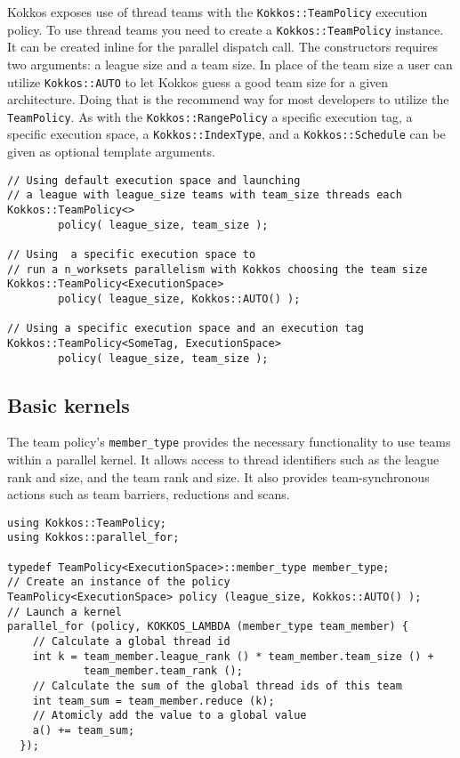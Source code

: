 Kokkos exposes use of thread teams with the \lstinline!Kokkos::TeamPolicy! execution policy.
To use thread teams you need to create a \lstinline|Kokkos::TeamPolicy| instance.
It can be created inline for the parallel dispatch call.
The constructors requires two arguments: a league size and a team size. 
In place of the team size a user can utilize \lstinline|Kokkos::AUTO| to let Kokkos guess a good team size for a given architecture.
Doing that is the recommend way for most developers to utilize the \lstinline|TeamPolicy|.
As with the  \lstinline|Kokkos::RangePolicy| a specific execution tag, a specific execution space, a \lstinline|Kokkos::IndexType|, and a \lstinline|Kokkos::Schedule| can be given as optional template arguments.
\begin{lstlisting}
// Using default execution space and launching 
// a league with league_size teams with team_size threads each
Kokkos::TeamPolicy<> 
        policy( league_size, team_size ); 

// Using  a specific execution space to 
// run a n_worksets parallelism with Kokkos choosing the team size
Kokkos::TeamPolicy<ExecutionSpace> 
        policy( league_size, Kokkos::AUTO() );

// Using a specific execution space and an execution tag 
Kokkos::TeamPolicy<SomeTag, ExecutionSpace> 
        policy( league_size, team_size ); 
\end{lstlisting}


\subsection{Basic kernels}\label{SS:Hierarchical:Teams:Kernels}

The team policy's \lstinline!member_type! provides the necessary functionality to use teams within a parallel kernel.
It allows access to thread identifiers such as the league rank and size, and the team rank and size.
It also provides team-synchronous actions such as team barriers, reductions and scans.
\begin{lstlisting}
using Kokkos::TeamPolicy;
using Kokkos::parallel_for;

typedef TeamPolicy<ExecutionSpace>::member_type member_type;
// Create an instance of the policy
TeamPolicy<ExecutionSpace> policy (league_size, Kokkos::AUTO() );
// Launch a kernel
parallel_for (policy, KOKKOS_LAMBDA (member_type team_member) {
    // Calculate a global thread id
    int k = team_member.league_rank () * team_member.team_size () +
            team_member.team_rank ();
    // Calculate the sum of the global thread ids of this team
    int team_sum = team_member.reduce (k);
    // Atomicly add the value to a global value
    a() += team_sum;
  });
\end{lstlisting}

